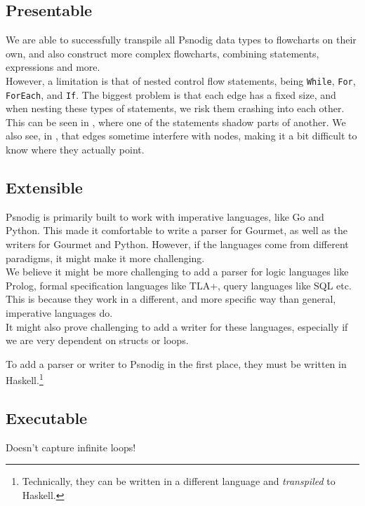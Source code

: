 \subsection{Presentable}


We are able to successfully transpile all Psnodig data types to flowcharts on their own, and also construct more complex flowcharts, combining statements, expressions and more. \\

However, a limitation is that of nested control flow statements, being \texttt{While}, \texttt{For}, \texttt{ForEach}, and \texttt{If}. The biggest problem is that each edge has a fixed size, and when nesting these types of statements, we risk them crashing into each other. This can be seen in , where one of the statements shadow parts of another. We also see, in , that edges sometime interfere with nodes, making it a bit difficult to know where they actually point.

\subsection{Extensible}


Psnodig is primarily built to work with imperative languages, like Go and Python. This made it comfortable to write a parser for Gourmet, as well as the writers for Gourmet and Python. However, if the languages come from different paradigms, it might make it more challenging. \\

We believe it might be more challenging to add a parser for logic languages like Prolog, formal specification languages like TLA+, query languages like SQL etc. This is because they work in a different, and more specific way than general, imperative languages do. \\

It might also prove challenging to add a writer for these languages, especially if we are very dependent on structs or loops.


To add a parser or writer to Psnodig in the first place, they must be written in Haskell.\footnote{Technically, they can be written in a different language and \textit{transpiled} to Haskell.}

\subsection{Executable}

Doesn't capture infinite loops!